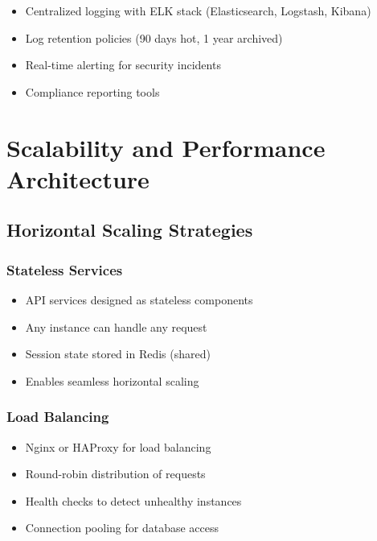 \documentclass[12pt,a4paper]{report}
\begin{document}
\begin{itemize}[label=\textbullet]
    \item Centralized logging with ELK stack (Elasticsearch, Logstash, Kibana)
    \item Log retention policies (90 days hot, 1 year archived)
    \item Real-time alerting for security incidents
    \item Compliance reporting tools
\end{itemize}

\newpage

\chapter{Scalability and Performance Architecture}

\section{Horizontal Scaling Strategies}

\subsection{Stateless Services}

\begin{itemize}[label=\textbullet]
    \item API services designed as stateless components
    \item Any instance can handle any request
    \item Session state stored in Redis (shared)
    \item Enables seamless horizontal scaling
\end{itemize}

\subsection{Load Balancing}

\begin{itemize}[label=\textbullet]
    \item Nginx or HAProxy for load balancing
    \item Round-robin distribution of requests
    \item Health checks to detect unhealthy instances
    \item Connection pooling for database access
\end{itemize}
\end{document}
